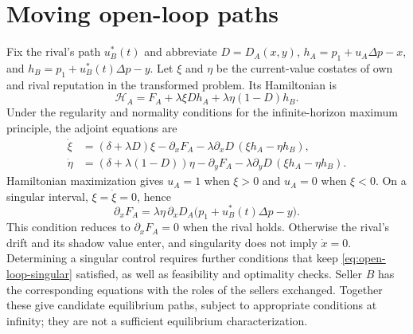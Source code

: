 \documentclass[11pt]{article}
\theoremstyle{definition}
\begin{document}
\section{Moving open-loop paths}\label{sec:moving}

Fix the rival's path $u_B^*(t)$ and abbreviate
$D=D_A(x,y)$, $h_A=p_1+u_A\Delta p-x$, and
$h_B=p_1+u_B^*(t)\Delta p-y$. Let $\xi$ and $\eta$ be the
current-value costates of own and rival
reputation in the transformed problem. Its Hamiltonian is
\begin{equation*}
\mathcal H_A=F_A+\lambda\xi D h_A+\lambda\eta(1-D)h_B.
\end{equation*}
Under the regularity and normality conditions for the infinite-horizon
maximum principle, the adjoint equations are
\begin{equation}\label{eq:transformed-adjoints}
\begin{aligned}
\dot\xi&=(\delta+\lambda D)\xi-\partial_xF_A
 -\lambda\partial_xD\,(\xi h_A-\eta h_B),\\
\dot\eta&=(\delta+\lambda(1-D))\eta-\partial_yF_A
 -\lambda\partial_yD\,(\xi h_A-\eta h_B).
\end{aligned}
\end{equation}
Hamiltonian maximization gives $u_A=1$ when $\xi>0$ and $u_A=0$ when
$\xi<0$. On a singular interval, $\xi=\dot\xi=0$, hence
\begin{equation}\label{eq:open-loop-singular}
\partial_xF_A=\lambda\eta\,\partial_xD_A
\bigl(p_1+u_B^*(t)\Delta p-y\bigr).
\end{equation}
This condition reduces to $\partial_xF_A=0$ when the rival holds.
Otherwise the rival's drift and its shadow value enter, and singularity
does not imply $\dot x=0$. Determining a singular control requires further
conditions that keep \eqref{eq:open-loop-singular} satisfied, as well as
feasibility and optimality checks. Seller $B$ has the corresponding
equations with the roles of the sellers exchanged. Together these give
candidate equilibrium paths, subject to appropriate conditions at infinity;
they are not a sufficient equilibrium characterization.
\end{document}
